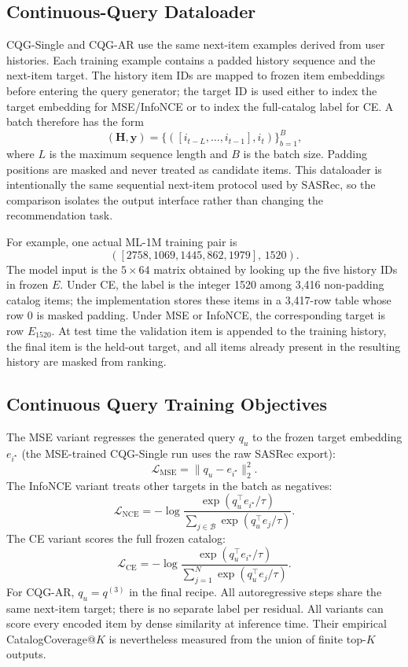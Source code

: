 \documentclass[preprint,12pt]{elsarticle}
\begin{document}
\subsection{Continuous-Query Dataloader}
\label{app:cqg_dataloader}

CQG-Single and CQG-AR use the same next-item examples derived from user histories. Each training example contains a padded history sequence and the next-item target. The history item IDs are mapped to frozen item embeddings before entering the query generator; the target ID is used either to index the target embedding for MSE/InfoNCE or to index the full-catalog label for CE. A batch therefore has the form
\[
(\mathbf{H}, \mathbf{y}) =
\{([i_{t-L},\ldots,i_{t-1}], i_t)\}_{b=1}^{B},
\]
where $L$ is the maximum sequence length and $B$ is the batch size. Padding positions are masked and never treated as candidate items. This dataloader is intentionally the same sequential next-item protocol used by SASRec, so the comparison isolates the output interface rather than changing the recommendation task.

For example, one actual ML-1M training pair is
\[
([2758,1069,1445,862,1979],\,1520).
\]
The model input is the \(5\times64\) matrix obtained by looking up the five
history IDs in frozen \(E\). Under CE, the label is the integer 1520 among
3,416 non-padding catalog items; the implementation stores these items in a
3,417-row table whose row 0 is masked padding. Under MSE or InfoNCE, the
corresponding target is row \(E_{1520}\). At test time the validation item is appended to the
training history, the final item is the held-out target, and all items already
present in the resulting history are masked from ranking.

\subsection{Continuous Query Training Objectives}
\label{app:cqg_losses}

The MSE variant regresses the generated query $q_u$ to the frozen target embedding $e_{i^\star}$ (the MSE-trained CQG-Single run uses the raw SASRec export):
\[
\mathcal{L}_{\mathrm{MSE}} =
\|q_u - e_{i^\star}\|_2^2.
\]
The InfoNCE variant treats other targets in the batch as negatives:
\[
\mathcal{L}_{\mathrm{NCE}} =
-\log
\frac{\exp(q_u^\top e_{i^\star}/\tau)}
{\sum_{j\in\mathcal{B}}\exp(q_u^\top e_j/\tau)}.
\]
The CE variant scores the full frozen catalog:
\[
\mathcal{L}_{\mathrm{CE}} =
-\log
\frac{\exp(q_u^\top e_{i^\star}/\tau)}
{\sum_{j=1}^{N}\exp(q_u^\top e_j/\tau)}.
\]
For CQG-AR, \(q_u=q^{(3)}\) in the final recipe.  All autoregressive steps
share the same next-item target; there is no separate label per residual.
All variants can score every encoded item by dense similarity at inference
time. Their empirical CatalogCoverage@$K$ is nevertheless measured from the
union of finite top-$K$ outputs.
\end{document}
